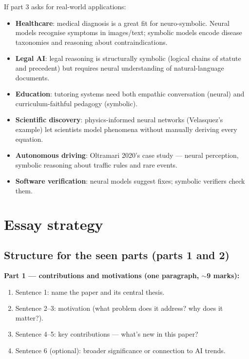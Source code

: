 \documentclass[11pt, a4paper]{article}
\begin{document}
If part 3 asks for real-world applications:

\begin{itemize}
  \item \textbf{Healthcare}: medical diagnosis is a great fit for neuro-symbolic. Neural models recognise symptoms in images/text; symbolic models encode disease taxonomies and reasoning about contraindications.
  \item \textbf{Legal AI}: legal reasoning is structurally symbolic (logical chains of statute and precedent) but requires neural understanding of natural-language documents.
  \item \textbf{Education}: tutoring systems need both empathic conversation (neural) and curriculum-faithful pedagogy (symbolic).
  \item \textbf{Scientific discovery}: physics-informed neural networks (Velasquez's example) let scientists model phenomena without manually deriving every equation.
  \item \textbf{Autonomous driving}: Oltramari 2020's case study — neural perception, symbolic reasoning about traffic rules and rare events.
  \item \textbf{Software verification}: neural models suggest fixes; symbolic verifiers check them.
\end{itemize}

\section{Essay strategy}

\subsection{Structure for the seen parts (parts 1 and 2)}

\textbf{Part 1 — contributions and motivations (one paragraph, $\sim$9 marks):}
\begin{enumerate}[itemsep=0pt, topsep=0pt]
  \item Sentence 1: name the paper and its central thesis.
  \item Sentence 2--3: motivation (what problem does it address? why does it matter?).
  \item Sentence 4--5: key contributions — what's new in this paper?
  \item Sentence 6 (optional): broader significance or connection to AI trends.
\end{enumerate}
\end{document}
